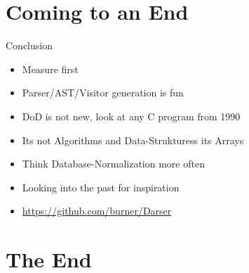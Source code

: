 \documentclass[aspectratio=169,notes]{beamer}
\begin{document}
	\section{Coming to an End}
	\begin{frame}[fragile]{Conclusion}
		\begin{itemize}
			\item Measure first \vspace{1cm}
			\item Parser/AST/Visitor generation is fun
			\item DoD is not new, look at any C program from 1990
			\item Its not Algorithms and Data-Strukturess its Arrays
			\item Think Database-Normalization more often
			\item Looking into the past for inspiration
			\vfill{}
			\item \url{https://github.com/burner/Darser}
		\end{itemize}
	\end{frame}

	\section{The End}
\end{document}
